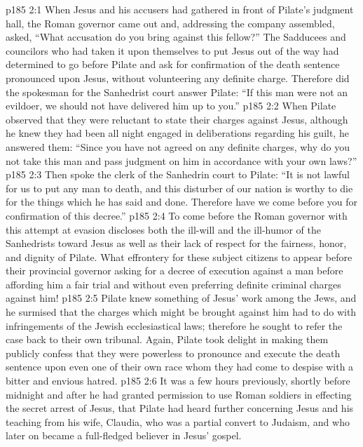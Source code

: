 \vs p185 2:1 When Jesus and his accusers had gathered in front of Pilate’s judgment hall, the Roman governor came out and, addressing the company assembled, asked, “What accusation do you bring against this fellow?” The Sadducees and councilors who had taken it upon themselves to put Jesus out of the way had determined to go before Pilate and ask for confirmation of the death sentence pronounced upon Jesus, without volunteering any definite charge. Therefore did the spokesman for the Sanhedrist court answer Pilate: “If this man were not an evildoer, we should not have delivered him up to you.”
\vs p185 2:2 When Pilate observed that they were reluctant to state their charges against Jesus, although he knew they had been all night engaged in deliberations regarding his guilt, he answered them: “Since you have not agreed on any definite charges, why do you not take this man and pass judgment on him in accordance with your own laws?”
\vs p185 2:3 Then spoke the clerk of the Sanhedrin court to Pilate: “It is not lawful for us to put any man to death, and this disturber of our nation is worthy to die for the things which he has said and done. Therefore have we come before you for confirmation of this decree.”
\vs p185 2:4 To come before the Roman governor with this attempt at evasion discloses both the ill\hyp{}will and the ill\hyp{}humor of the Sanhedrists toward Jesus as well as their lack of respect for the fairness, honor, and dignity of Pilate. What effrontery for these subject citizens to appear before their provincial governor asking for a decree of execution against a man before affording him a fair trial and without even preferring definite criminal charges against him!
\vs p185 2:5 Pilate knew something of Jesus’ work among the Jews, and he surmised that the charges which might be brought against him had to do with infringements of the Jewish ecclesiastical laws; therefore he sought to refer the case back to their own tribunal. Again, Pilate took delight in making them publicly confess that they were powerless to pronounce and execute the death sentence upon even one of their own race whom they had come to despise with a bitter and envious hatred.
\vs p185 2:6 \pc It was a few hours previously, shortly before midnight and after he had granted permission to use Roman soldiers in effecting the secret arrest of Jesus, that Pilate had heard further concerning Jesus and his teaching from his wife, Claudia, who was a partial convert to Judaism, and who later on became a full\hyp{}fledged believer in Jesus’ gospel.
